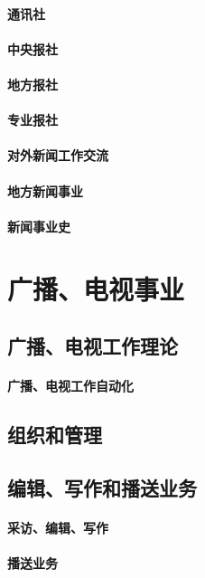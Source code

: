 \documentclass[UTF8]{../../ApplicationUniverse}
\begin{document}
        \subsubsection{通讯社}
        \subsubsection{中央报社}
        \subsubsection{地方报社}
        \subsubsection{专业报社}
        \subsubsection{对外新闻工作交流}
        \subsubsection{地方新闻事业}
        \subsubsection{新闻事业史}
 



\chapter{广播、电视事业}
\section{广播、电视工作理论}
    \subsubsection{广播、电视工作自动化}
\section{组织和管理}
\section{编辑、写作和播送业务}
    \subsubsection{采访、编辑、写作}
    \subsubsection{播送业务}
\end{document}
